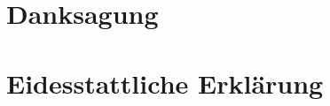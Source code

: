 

	 
	
	
	
	\clearpage
	\chapter*{Danksagung}
	
	\clearpage
	\chapter*{Eidesstattliche Erklärung}
	


